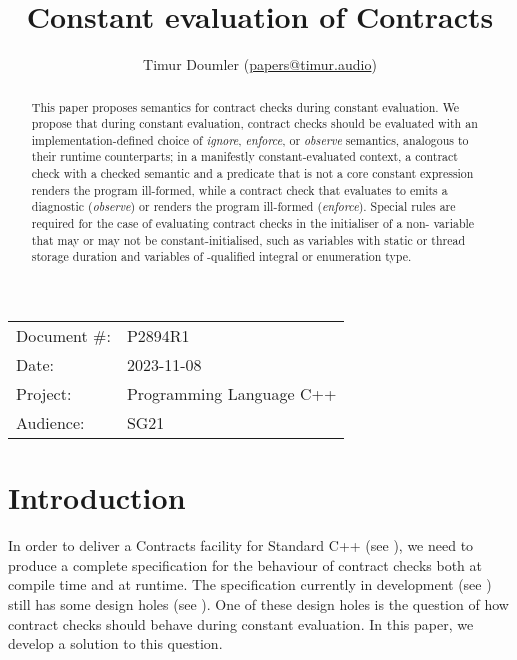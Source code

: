 


\title{Constant evaluation of Contracts}
\author{ Timur Doumler \small(\href{mailto:papers@timur.audio}{papers@timur.audio})}
\date{}
\maketitle

\begin{tabular}{ll}
Document \#: & P2894R1 \\
Date: &2023-11-08 \\
Project: & Programming Language C++ \\
Audience: & SG21
\end{tabular}

\begin{abstract}
This paper proposes semantics for contract checks during constant evaluation. We propose that during constant evaluation, contract checks should be evaluated with an implementation-defined choice of \emph{ignore}, \emph{enforce}, or \emph{observe} semantics, analogous to their runtime counterparts; in a manifestly constant-evaluated context, a contract check with a checked semantic and a predicate that is not a core constant expression renders the program ill-formed, while a contract check that evaluates to  emits a diagnostic (\emph{observe}) or renders the program ill-formed (\emph{enforce}). Special rules are required for the case of evaluating contract checks in the initialiser of a non- variable that may or may not be constant-initialised, such as variables with static or thread storage duration and variables of -qualified integral or enumeration type.
\end{abstract}

\section{Introduction}
\label{sec:intro}

In order to deliver a Contracts facility for Standard C++ (see \cite{P2695R1}), we need to produce a complete specification for the behaviour of contract checks both at compile time and at runtime. The specification currently in development (see \cite{P2900R1}) still has some design holes (see \cite{P2896R0}). One of these design holes is the question of how contract checks should behave during constant evaluation. In this paper, we develop a solution to this question.

